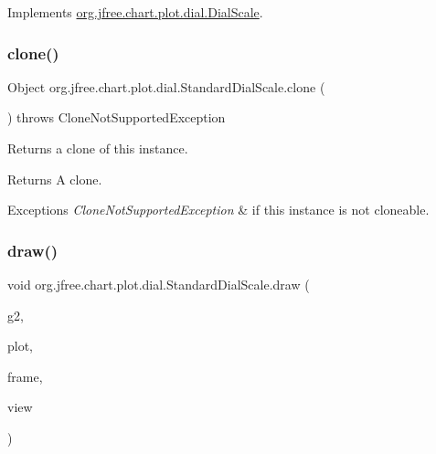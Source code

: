 Implements \mbox{\hyperlink{interfaceorg_1_1jfree_1_1chart_1_1plot_1_1dial_1_1_dial_scale_a53cbe3e0ce73e266dab63941474cc343}{org.\+jfree.\+chart.\+plot.\+dial.\+Dial\+Scale}}.

\mbox{\label{classorg_1_1jfree_1_1chart_1_1plot_1_1dial_1_1_standard_dial_scale_aebbf0fae2794ae577f2a2fc7fa7eec6c}} 
\subsubsection{\texorpdfstring{clone()}{clone()}}
{\footnotesize\ttfamily Object org.\+jfree.\+chart.\+plot.\+dial.\+Standard\+Dial\+Scale.\+clone (\begin{DoxyParamCaption}{ }\end{DoxyParamCaption}) throws Clone\+Not\+Supported\+Exception}

Returns a clone of this instance.

\begin{DoxyReturn}{Returns}
A clone.
\end{DoxyReturn}

\begin{DoxyExceptions}{Exceptions}
{\em Clone\+Not\+Supported\+Exception} & if this instance is not cloneable. \\
\hline
\end{DoxyExceptions}
\mbox{\label{classorg_1_1jfree_1_1chart_1_1plot_1_1dial_1_1_standard_dial_scale_a15369f20c895a86ffd0101f3bef1e6b0}} 
\subsubsection{\texorpdfstring{draw()}{draw()}}
{\footnotesize\ttfamily void org.\+jfree.\+chart.\+plot.\+dial.\+Standard\+Dial\+Scale.\+draw (\begin{DoxyParamCaption}\item[{Graphics2D}]{g2,  }\item[{\mbox{\hyperlink{classorg_1_1jfree_1_1chart_1_1plot_1_1dial_1_1_dial_plot}{Dial\+Plot}}}]{plot,  }\item[{Rectangle2D}]{frame,  }\item[{Rectangle2D}]{view }\end{DoxyParamCaption})}

